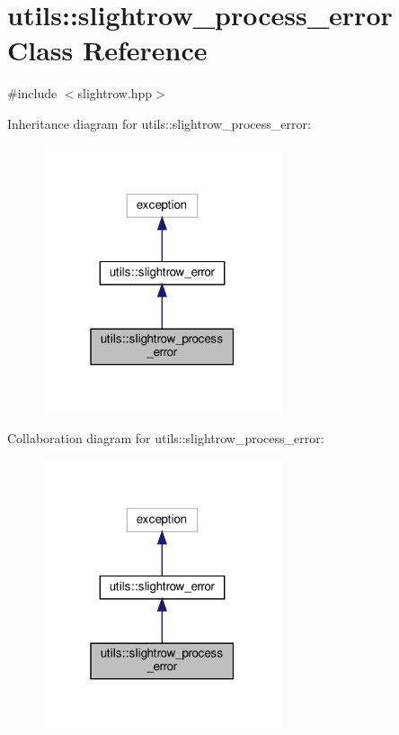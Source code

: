 \hypertarget{classutils_1_1slightrow__process__error}{}\section{utils\+:\+:slightrow\+\_\+process\+\_\+error Class Reference}
\label{classutils_1_1slightrow__process__error}


{\ttfamily \#include $<$slightrow.\+hpp$>$}



Inheritance diagram for utils\+:\+:slightrow\+\_\+process\+\_\+error\+:
\nopagebreak
\begin{figure}[H]
\begin{center}
\leavevmode
\includegraphics[width=199pt]{classutils_1_1slightrow__process__error__inherit__graph}
\end{center}
\end{figure}


Collaboration diagram for utils\+:\+:slightrow\+\_\+process\+\_\+error\+:
\nopagebreak
\begin{figure}[H]
\begin{center}
\leavevmode
\includegraphics[width=199pt]{classutils_1_1slightrow__process__error__coll__graph}
\end{center}
\end{figure}


